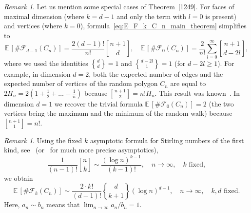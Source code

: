 \documentclass[12pt, reqno]{amsart}
\theoremstyle{plain}
\theoremstyle{definition}
\theoremstyle{remark}
\newtheorem{remark}[theorem]{Remark}
\begin{document}
\begin{remark}
Let us mention some special cases of Theorem~\ref{1249}. For faces of maximal dimension (where $k=d-1$ and only the term with $l=0$ is present) and vertices (where $k=0$), formula~\eqref{eq:E_F_k_C_n_main_theorem} simplifies to
$$
{\mathbb E}\, [\#\mathcal{F}_{d-1}(C_n)]
=
\frac {2(d-1)!} {n!}
{\genfrac{[}{]}{0pt}{}{{n+1}}{{d}}},
\quad
{\mathbb E}\, [\#\mathcal{F}_{0}(C_n)]
=
\frac 2 {n!} \sum_{l=0}^\infty
 {\genfrac{[}{]}{0pt}{}{{n+1}}{{d-2l}}},
$$
where we used the identities ${\genfrac{\{}{\}}{0pt}{}{{d}}{{d}}} = 1$ and ${\genfrac{\{}{\}}{0pt}{}{{d-2l}}{{1}}} = 1$ (for $d-2l\geq 1$).  For example, in dimension $d=2$, both the expected number of edges and the expected number of vertices of the random polygon $C_n$ are equal to $2H_{n} = 2 \left(1+\frac 12 +\ldots + \frac 1{n}\right)$ because ${\genfrac{[}{]}{0pt}{}{{n+1}}{2}} = n! H_{n}$. This result was known~\cite{Nielsen, vysotsky_zaporozhets}. In dimension $d=1$ we recover the trivial formula ${\mathbb E}\, [\#\mathcal{F}_{0}(C_n)] = 2$  (the two vertices being the maximum and the minimum of the random walk) because ${\genfrac{[}{]}{0pt}{}{{n+1}}{1}} = n!$.
\end{remark}

\begin{remark}
Using the fixed $k$ asymptotic formula for Stirling numbers of the first kind, see~\cite[page~160]{jordan_book} (or~\cite{wilf} for much more precise asymptotics),
\begin{equation}\label{eq:stirling_asympt}
\frac 1{(n-1)!} {\genfrac{[}{]}{0pt}{}{{n}}{{k}}} \sim \frac{(\log n)^{k-1}}{(k-1)!}, \quad n\to\infty, \quad k \text{ fixed},
\end{equation}
we obtain 
\begin{equation}\label{eq:F_k_asympt}
{\mathbb E}\, [\#\mathcal{F}_k(C_n)]  \sim \frac{2\cdot k!}{(d-1)!} {\genfrac{\{}{\}}{0pt}{}{{d}}{{k+1}}} (\log n)^{d-1}, \quad n\to\infty, \quad k, d \text{ fixed}.
\end{equation}
Here, $a_n\sim b_n$ means that $\lim_{n\to\infty} a_n/b_n = 1$.
\end{remark}
\end{document}
